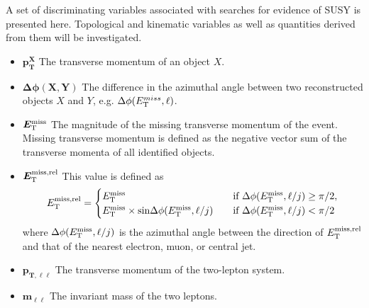 A set of discriminating variables associated with searches for evidence of SUSY is presented here. Topological and kinematic variables as well as quantities derived from them will be investigated.

\begin{itemize}[leftmargin=0cm]
\item[]$\bm{p^X_T}$ The transverse momentum of an object $X$.
\item[]$\bm{\Delta\phi(X,Y)}$ The difference in the azimuthal angle between two reconstructed objects $X$ and $Y$, e.g. ${\Delta\phi(E_{\text T}^{miss},\ell)}$.
\item[]$\bm{E_{\text T}^{\text {miss}}}$ The magnitude of the missing transverse momentum of the event. Missing transverse momentum is defined as the negative vector sum of the transverse momenta of all identified objects.
\item[]$\bm{E^{\text{miss,rel}}_{\text T}}$ This value is defined as 
\[
 E_{\text T}^{\text {miss,rel}} = 
  \begin{cases} 
   E_{\text T}^{\text {miss}}\quad & \text{if } \Delta\phi(E_{\text T}^{\text {miss}},\ell/j) \geq \pi/2, \\
   E_{\text T}^{\text {miss}}\times \text{sin}\Delta\phi(E_{\text T}^{\text {miss}},\ell/j) \quad      & \text{if } \Delta\phi(E_{\text T}^{\text {miss}},\ell/j)<\pi/2
  \end{cases}
\]
where $\Delta\phi(E_{\text T}^{\text {miss}},\ell/j)$ is the azimuthal angle between the direction of $E_{\text T}^{\text {miss,rel}}$ and that of the nearest electron, muon, or central jet. 
\item[]$\bm{p_{T,\ell \ell}}$ The transverse momentum of the two-lepton system. 
\item[]$\bm{m_{\ell \ell}}$ The invariant mass of the two leptons.
\end{itemize}

